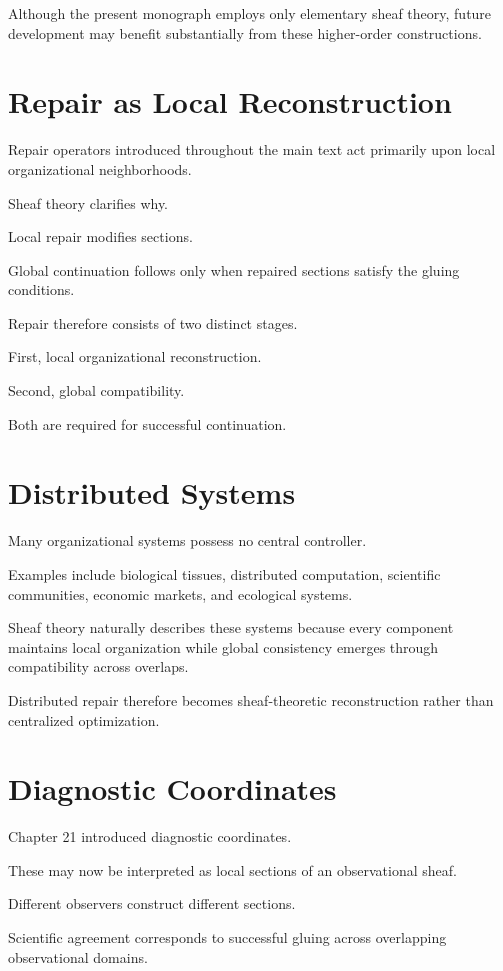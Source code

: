 \documentclass[11pt,oneside]{book}
\numberwithin{equation}{chapter}
\theoremstyle{definition}
\theoremstyle{plain}
\begin{document}
Although the present monograph employs only elementary sheaf theory,
future development may benefit substantially from these higher-order
constructions.

\section{Repair as Local Reconstruction}

Repair operators introduced throughout the main text act primarily upon
local organizational neighborhoods.

Sheaf theory clarifies why.

Local repair modifies sections.

Global continuation follows only when repaired sections satisfy the
gluing conditions.

Repair therefore consists of two distinct stages.

First, local organizational reconstruction.

Second, global compatibility.

Both are required for successful continuation.

\section{Distributed Systems}

Many organizational systems possess no central controller.

Examples include biological tissues, distributed computation, scientific
communities, economic markets, and ecological systems.

Sheaf theory naturally describes these systems because every component
maintains local organization while global consistency emerges through
compatibility across overlaps.

Distributed repair therefore becomes sheaf-theoretic reconstruction
rather than centralized optimization.

\section{Diagnostic Coordinates}

Chapter 21 introduced diagnostic coordinates.

These may now be interpreted as local sections of an observational sheaf.

Different observers construct different sections.

Scientific agreement corresponds to successful gluing across overlapping
observational domains.
\end{document}
